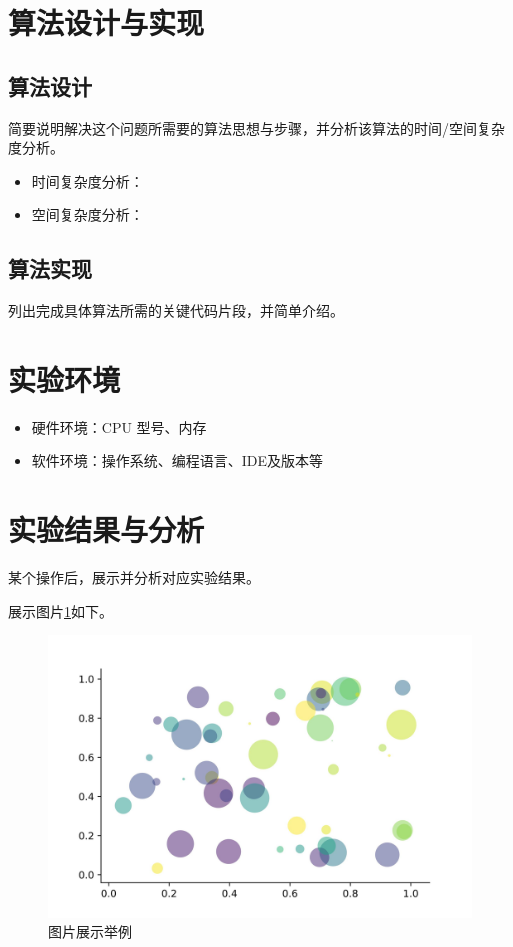 \documentclass[12pt]{article}
\begin{document}
\section{算法设计与实现}

\subsection{算法设计}

简要说明解决这个问题所需要的算法思想与步骤，并分析该算法的时间/空间复杂度分析。

\begin{itemize}
    \item 时间复杂度分析：
    \item 空间复杂度分析：
\end{itemize}

\subsection{算法实现}

列出完成具体算法所需的关键代码片段，并简单介绍。


\section{实验环境}
\begin{itemize}
    \item 硬件环境：CPU 型号、内存
    \item 软件环境：操作系统、编程语言、IDE及版本等
\end{itemize}

\section{实验结果与分析}

某个操作后，展示并分析对应实验结果。

展示图片\cref{fig:show}如下。

\begin{figure}[htb!]
    \centering
    \includegraphics[width=0.4\linewidth]{image/scatter.jpg}  %
    \caption{图片展示举例}  %
    \label{fig:show}  %
\end{figure}
 
\end{document}
